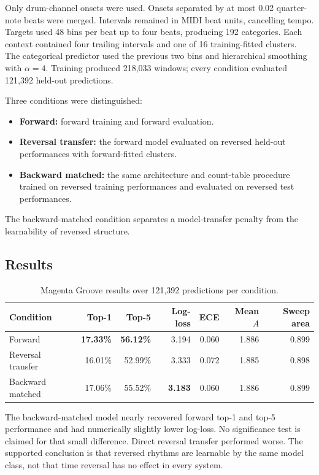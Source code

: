 Only drum-channel onsets were used. Onsets separated by at most 0.02 quarter-note beats were merged. Intervals remained in MIDI beat units, cancelling tempo. Targets used 48 bins per beat up to four beats, producing 192 categories. Each context contained four trailing intervals and one of 16 training-fitted clusters. The categorical predictor used the previous two bins and hierarchical smoothing with $\alpha=4$. Training produced 218,033 windows; every condition evaluated 121,392 held-out predictions.

Three conditions were distinguished:
\begin{itemize}
  \item \textbf{Forward:} forward training and forward evaluation.
  \item \textbf{Reversal transfer:} the forward model evaluated on reversed held-out performances with forward-fitted clusters.
  \item \textbf{Backward matched:} the same architecture and count-table procedure trained on reversed training performances and evaluated on reversed test performances.
\end{itemize}
The backward-matched condition separates a model-transfer penalty from the learnability of reversed structure.

\subsection{Results}
\begin{table}[htbp]
\centering
\caption{Magenta Groove results over 121,392 predictions per condition.}
\label{tab:groove}
{\small
\setlength{\tabcolsep}{4pt}
\begin{tabular}{lrrrrrr}
\toprule
Condition&Top-1&Top-5&Log-loss&ECE&Mean $A$&Sweep area\\
\midrule
Forward&\textbf{17.33\%}&\textbf{56.12\%}&3.194&0.060&1.886&0.899\\
Reversal transfer&16.01\%&52.99\%&3.333&0.072&1.885&0.898\\
Backward matched&17.06\%&55.52\%&\textbf{3.183}&0.060&1.886&0.899\\
\bottomrule
\end{tabular}}
\end{table}
The backward-matched model nearly recovered forward top-1 and top-5 performance and had numerically slightly lower log-loss. No significance test is claimed for that small difference. Direct reversal transfer performed worse. The supported conclusion is that reversed rhythms are learnable by the same model class, not that time reversal has no effect in every system.

